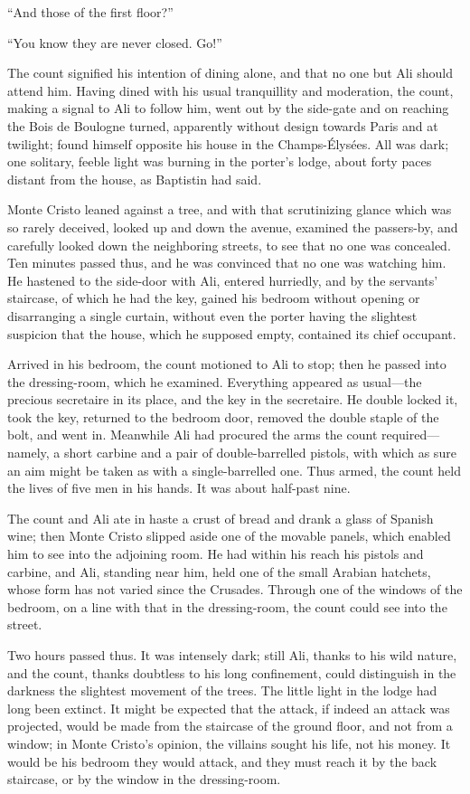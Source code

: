 “And those of the first floor?”

“You know they are never closed. Go!”

The count signified his intention of dining alone, and that no one but
Ali should attend him. Having dined with his usual tranquillity and
moderation, the count, making a signal to Ali to follow him, went out
by the side-gate and on reaching the Bois de Boulogne turned,
apparently without design towards Paris and at twilight; found himself
opposite his house in the Champs-Élysées. All was dark; one solitary,
feeble light was burning in the porter’s lodge, about forty paces
distant from the house, as Baptistin had said.

Monte Cristo leaned against a tree, and with that scrutinizing glance
which was so rarely deceived, looked up and down the avenue, examined
the passers-by, and carefully looked down the neighboring streets, to
see that no one was concealed. Ten minutes passed thus, and he was
convinced that no one was watching him. He hastened to the side-door
with Ali, entered hurriedly, and by the servants’ staircase, of which
he had the key, gained his bedroom without opening or disarranging a
single curtain, without even the porter having the slightest suspicion
that the house, which he supposed empty, contained its chief occupant.

Arrived in his bedroom, the count motioned to Ali to stop; then he
passed into the dressing-room, which he examined. Everything appeared
as usual—the precious secretaire in its place, and the key in the
secretaire. He double locked it, took the key, returned to the bedroom
door, removed the double staple of the bolt, and went in. Meanwhile Ali
had procured the arms the count required—namely, a short carbine and a
pair of double-barrelled pistols, with which as sure an aim might be
taken as with a single-barrelled one. Thus armed, the count held the
lives of five men in his hands. It was about half-past nine.

The count and Ali ate in haste a crust of bread and drank a glass of
Spanish wine; then Monte Cristo slipped aside one of the movable
panels, which enabled him to see into the adjoining room. He had within
his reach his pistols and carbine, and Ali, standing near him, held one
of the small Arabian hatchets, whose form has not varied since the
Crusades. Through one of the windows of the bedroom, on a line with
that in the dressing-room, the count could see into the street.

Two hours passed thus. It was intensely dark; still Ali, thanks to his
wild nature, and the count, thanks doubtless to his long confinement,
could distinguish in the darkness the slightest movement of the trees.
The little light in the lodge had long been extinct. It might be
expected that the attack, if indeed an attack was projected, would be
made from the staircase of the ground floor, and not from a window; in
Monte Cristo’s opinion, the villains sought his life, not his money. It
would be his bedroom they would attack, and they must reach it by the
back staircase, or by the window in the dressing-room.

